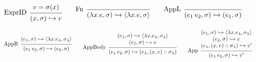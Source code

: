 \documentclass[acmsmall,screen,review]{acmart}\settopmatter{printfolios=true,printccs=false,printacmref=false}
\newcommand*{\cons}{::}
\newcommand*{\ctx}{\sigma}
\newcommand*{\semarrow}{\hookrightarrow}
\begin{document}
\begin{figure}[t!]
  \scriptsize
  \begin{flushright}
    \fbox{$(e,\ctx)\semarrow V\text{ or }(e',\ctx')$}
  \end{flushright}
  \centering
  \vspace{0pt} %
  \[
    \begin{prooftree}
      \hypo{v=\ctx(x)}
      \infer[left label=ExprID]1{
      (x, \ctx)
      \semarrow
      v
      }
    \end{prooftree}\qquad
    \begin{prooftree}
      \infer[left label=Fn]0{
      (\lambda x.e, \ctx)
      \semarrow
      \langle\lambda x.e, \ctx\rangle
      }
    \end{prooftree}\qquad
    \begin{prooftree}
      \infer[left label={AppL}]0{
      (e_{1}\:e_{2}, \ctx)
      \semarrow
      (e_{1},\ctx)
      }
    \end{prooftree}
  \]

  \[
    \begin{prooftree}
      \hypo{
        \begin{matrix}
          (e_{1}, \ctx)
          \semarrow
          \langle\lambda x.e_{\lambda}, \ctx_{\lambda}\rangle
        \end{matrix}
      }
      \infer[left label={AppR}]1{
      (e_{1}\:e_{2}, \ctx)
      \semarrow
      (e_{2}, \ctx)
      }
    \end{prooftree}\qquad
    \begin{prooftree}
      \hypo{
        \begin{matrix}
          (e_{1}, \ctx)
          \semarrow
          \langle\lambda x.e_{\lambda}, \ctx_{\lambda}\rangle \\
          (e_{2}, \ctx)
          \semarrow
          v
        \end{matrix}
      }
      \infer[left label={AppBody}]1{
      (e_{1}\:e_{2}, \ctx)
      \semarrow
      (e_{\lambda}, (x, v)\cons \ctx_{\lambda})
      }
    \end{prooftree}\qquad
    \begin{prooftree}
      \hypo{
        \begin{matrix}
          (e_{1}, \ctx)
          \semarrow
          \langle\lambda x.e_{\lambda}, \ctx_{\lambda}\rangle \\
          (e_{2}, \ctx)
          \semarrow
          v                                                   \\
          (e_{\lambda}, (x, v)\cons \ctx_{\lambda})
          \semarrow
          v'
        \end{matrix}
      }
      \infer[left label={App}]1{
      (e_{1}\:e_{2}, \ctx)
      \semarrow
      v'
      }
    \end{prooftree}
  \]


\end{figure}
\end{document}
